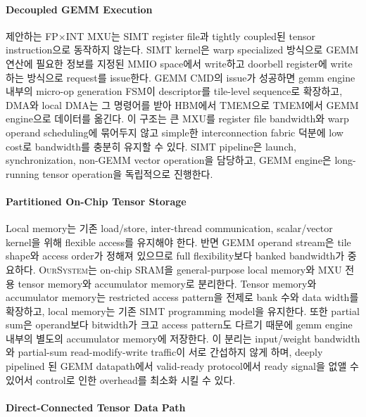 \documentclass[11pt]{article}
\newcommand{\ours}{\textsc{OurSystem}}
\newcommand{\fpint}{FP$\times$INT}
\begin{document}
\paragraph{Decoupled GEMM Execution}

제안하는 \fpint{} MXU는 SIMT register file과 tightly coupled된 tensor instruction으로 동작하지 않는다.
SIMT kernel은 warp specialized 방식으로 GEMM 연산에 필요한 정보를 지정된 MMIO space에서 write하고 doorbell register에 write하는 방식으로 request를 issue한다.
GEMM CMD의 issue가 성공하면 gemm engine 내부의 micro-op generation FSM이 descriptor를 tile-level sequence로 확장하고, DMA와 local DMA는 그 명령어를 받아 HBM에서 TMEM으로 TMEM에서 GEMM engine으로 데이터를 옮긴다.
이 구조는 큰 MXU를 register file bandwidth와 warp operand scheduling에 묶어두지 않고 simple한 interconnection fabric 덕분에 low cost로 bandwidth를 충분히 유지할 수 있다.
SIMT pipeline은 launch, synchronization, non-GEMM vector operation을 담당하고, GEMM engine은 long-running tensor operation을 독립적으로 진행한다.

\paragraph{Partitioned On-Chip Tensor Storage}

Local memory는 기존 load/store, inter-thread communication, scalar/vector kernel을 위해 flexible access를 유지해야 한다.
반면 GEMM operand stream은 tile shape와 access order가 정해져 있으므로 full flexibility보다 banked bandwidth가 중요하다.
\ours{}는 on-chip SRAM을 general-purpose local memory와 MXU 전용 tensor memory와 accumulator memory로 분리한다.
Tensor memory와 accumulator memory는 restricted access pattern을 전제로 bank 수와 data width를 확장하고, local memory는 기존 SIMT programming model을 유지한다.
또한 partial sum은 operand보다 bitwidth가 크고 access pattern도 다르기 때문에 gemm engine 내부의 별도의 accumulator memory에 저장한다.
이 분리는 input/weight bandwidth와 partial-sum read-modify-write traffic이 서로 간섭하지 않게 하며, deeply pipelined 된 GEMM datapath에서 valid-ready protocol에서 ready signal을 없앨 수 있어서 control로 인한 overhead를 최소화 시킬 수 있다.

\paragraph{Direct-Connected Tensor Data Path}
\end{document}
